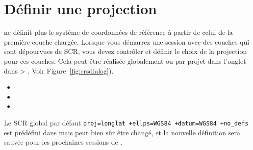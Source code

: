 \section{Définir une projection}
\label{sec:projection-specifying}

\qg ne définit plus le système de coordonnées de référence à partir de  celui de la première couche chargée. Lorsque vous démarrez une session \qg avec des couches qui sont dépourvues de SCR, vous devez contrôler et définir le choix de la projection pour ces couches. Cela peut être réalisée globalement ou par projet dans l'onglet  dans  > .  Voir Figure~\ref{fig:crsdialog}).

\begin{itemize}[label=--]
\item {}
\item {}
\item {}
\end{itemize}

Le SCR global par défaut \texttt{proj=longlat +ellps=WGS84 +datum=WGS84 +no\_defs} est prédéfini dans \qg mais peut bien sûr être changé, et la nouvelle définition sera sauvée pour les prochaines sessions de \qg.

